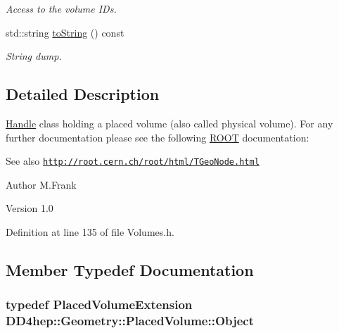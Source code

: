 \begin{DoxyCompactItemize}
\begin{DoxyCompactList}\small\item\em Access to the volume IDs. \item\end{DoxyCompactList}\item 
std::string \hyperlink{class_d_d4hep_1_1_geometry_1_1_placed_volume_a0eb030432fb329dcae65b2996c09324b}{toString} () const 
\begin{DoxyCompactList}\small\item\em String dump. \item\end{DoxyCompactList}\end{DoxyCompactItemize}


\subsection{Detailed Description}
\hyperlink{class_d_d4hep_1_1_handle}{Handle} class holding a placed volume (also called physical volume). For any further documentation please see the following \hyperlink{namespace_r_o_o_t}{ROOT} documentation: \begin{DoxySeeAlso}{See also}
\href{http://root.cern.ch/root/html/TGeoNode.html}{\tt http://root.cern.ch/root/html/TGeoNode.html}
\end{DoxySeeAlso}
\begin{DoxyAuthor}{Author}
M.Frank 
\end{DoxyAuthor}
\begin{DoxyVersion}{Version}
1.0 
\end{DoxyVersion}


Definition at line 135 of file Volumes.h.

\subsection{Member Typedef Documentation}
\hypertarget{class_d_d4hep_1_1_geometry_1_1_placed_volume_a9ae505098ca6976164b959e1d8b4bbb0}{
\subsubsection[{Object}]{\setlength{\rightskip}{0pt plus 5cm}typedef {\bf PlacedVolumeExtension} {\bf DD4hep::Geometry::PlacedVolume::Object}}}
\label{class_d_d4hep_1_1_geometry_1_1_placed_volume_a9ae505098ca6976164b959e1d8b4bbb0}


